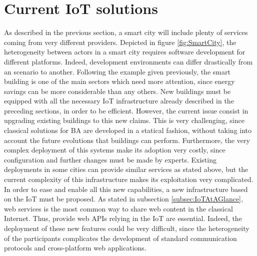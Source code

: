 \section{Current IoT solutions}
As described in the previous section, a smart city will include plenty of services coming from very different providers.
Depicted in figure \ref{fig:SmartCity}, the heterogeneity between actors in a smart city requires software development for different platforms.
Indeed, development environments can differ drastically from an scenario to another.
Following the example given previously, the smart building is one of the main sectors which need more attention, since energy savings can be more considerable than any others.
New buildings must be equipped with all the necessary IoT infrastructure already described in the preceding sections, in order to be efficient.
However, the current issue consist in upgrading existing buildings to this new claims.
This is very challenging, since classical solutions for BA are developed in a statical fashion, without taking into account the future evolutions that buildings can perform.
Furthermore, the very complex deployment of this systems make its adoption very costly, since configuration and further changes must be made by experts.
Existing deployments in some cities can provide similar services as stated above, but the current complexity of this infrastructure makes its exploitation very complicated.
In order to ease and enable all this new capabilities, a new infrastructure based on the IoT must be proposed.
As stated in subsection \ref{subsec:IoTAtAGlance}, web services is the most common way to share web content in the classical Internet.
Thus, provide web APIs relying in the IoT are essential.
Indeed, the deployment of these new features could be very difficult, since the heterogeneity of the participants complicates the development of standard communication protocols and cross-platform web applications.




